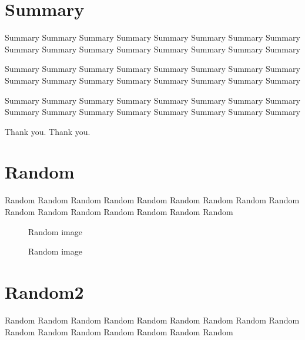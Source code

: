 \documentclass[12pt]{article} %
\begin{document}
\newpage
\section{Summary}
\label{kadai}

Summary Summary Summary Summary 
Summary Summary Summary Summary 
Summary Summary Summary Summary 
Summary Summary Summary Summary 

Summary Summary Summary Summary 
Summary Summary Summary Summary 
Summary Summary Summary Summary 
Summary Summary Summary Summary 

Summary Summary Summary Summary 
Summary Summary Summary Summary 
Summary Summary Summary Summary 
Summary Summary Summary Summary 

%
%
\acknowledgements

Thank you. Thank you.
%
%
\newpage


%
%
\appendix

\section{Random}
\label{omake1}

Random Random Random Random
Random Random Random Random
Random Random Random Random
Random Random Random Random

\begin{figure}
\centerline{Random image}
\caption{Random image}
\end{figure}


\section{Random2}

Random Random Random Random
Random Random Random Random
Random Random Random Random
Random Random Random Random
\end{document}
